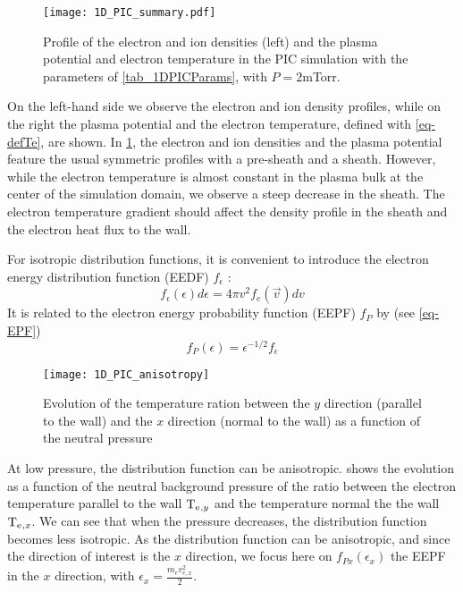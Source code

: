     \begin{figure}[!htb]
      \centering
      \texttt{[image: 1D\_PIC\_summary.pdf]}
      \caption{Profile of the electron and ion densities (left) and the plasma potential and electron temperature in the PIC simulation with the parameters of \cref{tab_1DPICParams}, with $P=2$mTorr.}
      \label{fig-PIC1}
    \end{figure}


    On the left-hand side we observe the electron and ion density profiles, while on the right the plasma potential and the electron temperature, defined with \cref{eq-defTe}, are shown.
    In \cref{fig-PIC1}, the electron and ion densities and the plasma potential feature the usual symmetric profiles with a pre-sheath and a sheath.
    However, while the electron temperature is almost constant in the plasma bulk at the center of the simulation domain, we observe a steep decrease in the sheath.
    The electron temperature gradient should affect the density profile in the sheath and the electron heat flux to the wall.

    \vspace{1em}
    For isotropic distribution functions, it is convenient to introduce the electron energy distribution function (EEDF) $f_{\epsilon}$ \citep{chabert2011}\string:
    \begin{equation}
    f_{\epsilon}(\epsilon) d\epsilon = 4 \pi v^2 f_e(\vec{v}) dv
    \end{equation}
    It is related to the electron energy probability function (EEPF) $f_{P}$ by (see \cref{eq-EPF})
    \begin{equation}
    f_{P}(\epsilon) = \epsilon^{-1/2} f_{\epsilon}
    \end{equation}

    \begin{figure}[!hbt]
      \centering
      \texttt{[image: 1D\_PIC\_anisotropy]}
      \caption{Evolution of the temperature ration between the $y$ direction (parallel to the wall) and the $x$ direction (normal to the wall) as a function of the neutral pressure}
      \label{fig-anisotropy1D}
    \end{figure}
    At low pressure, the distribution function can be anisotropic.
     shows the evolution as a function of the neutral background pressure of the ratio between the electron temperature parallel to the wall $\mathrm{T_e}{}_{, y}$ and the temperature normal the the wall $\mathrm{T_e}{}_{, x}$.
    We can see that when the pressure decreases, the distribution function becomes less isotropic.
    As the distribution function can be anisotropic, and since the direction of interest is the $x$ direction, we focus here on $f_{P x}(\epsilon_x)$ the EEPF in the $x$ direction, with $\epsilon_x = \frac{m_e v_{e,x}^2}{2}$.


